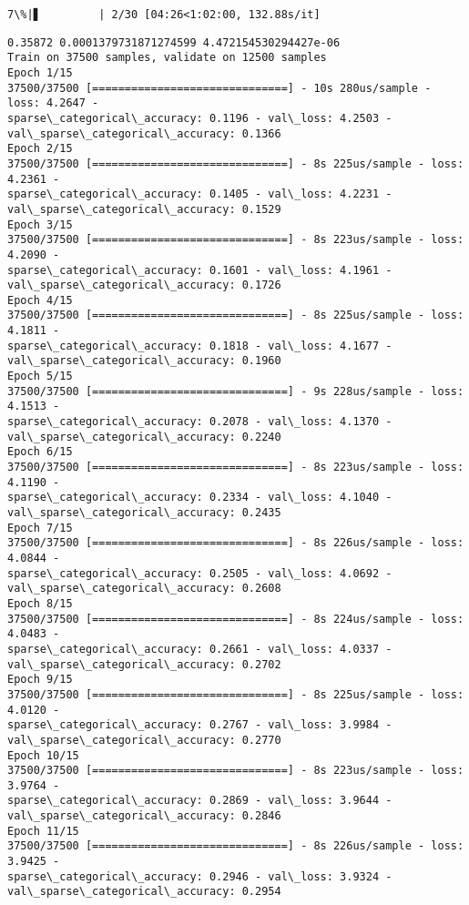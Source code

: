 \documentclass[11pt]{article}
\begin{document}
    \begin{Verbatim}[commandchars=\\\{\}]
  7\%|▋         | 2/30 [04:26<1:02:00, 132.88s/it]
    \end{Verbatim}

    \begin{Verbatim}[commandchars=\\\{\}]
0.35872 0.0001379731871274599 4.472154530294427e-06
Train on 37500 samples, validate on 12500 samples
Epoch 1/15
37500/37500 [==============================] - 10s 280us/sample - loss: 4.2647 -
sparse\_categorical\_accuracy: 0.1196 - val\_loss: 4.2503 -
val\_sparse\_categorical\_accuracy: 0.1366
Epoch 2/15
37500/37500 [==============================] - 8s 225us/sample - loss: 4.2361 -
sparse\_categorical\_accuracy: 0.1405 - val\_loss: 4.2231 -
val\_sparse\_categorical\_accuracy: 0.1529
Epoch 3/15
37500/37500 [==============================] - 8s 223us/sample - loss: 4.2090 -
sparse\_categorical\_accuracy: 0.1601 - val\_loss: 4.1961 -
val\_sparse\_categorical\_accuracy: 0.1726
Epoch 4/15
37500/37500 [==============================] - 8s 225us/sample - loss: 4.1811 -
sparse\_categorical\_accuracy: 0.1818 - val\_loss: 4.1677 -
val\_sparse\_categorical\_accuracy: 0.1960
Epoch 5/15
37500/37500 [==============================] - 9s 228us/sample - loss: 4.1513 -
sparse\_categorical\_accuracy: 0.2078 - val\_loss: 4.1370 -
val\_sparse\_categorical\_accuracy: 0.2240
Epoch 6/15
37500/37500 [==============================] - 8s 223us/sample - loss: 4.1190 -
sparse\_categorical\_accuracy: 0.2334 - val\_loss: 4.1040 -
val\_sparse\_categorical\_accuracy: 0.2435
Epoch 7/15
37500/37500 [==============================] - 8s 226us/sample - loss: 4.0844 -
sparse\_categorical\_accuracy: 0.2505 - val\_loss: 4.0692 -
val\_sparse\_categorical\_accuracy: 0.2608
Epoch 8/15
37500/37500 [==============================] - 8s 224us/sample - loss: 4.0483 -
sparse\_categorical\_accuracy: 0.2661 - val\_loss: 4.0337 -
val\_sparse\_categorical\_accuracy: 0.2702
Epoch 9/15
37500/37500 [==============================] - 8s 225us/sample - loss: 4.0120 -
sparse\_categorical\_accuracy: 0.2767 - val\_loss: 3.9984 -
val\_sparse\_categorical\_accuracy: 0.2770
Epoch 10/15
37500/37500 [==============================] - 8s 223us/sample - loss: 3.9764 -
sparse\_categorical\_accuracy: 0.2869 - val\_loss: 3.9644 -
val\_sparse\_categorical\_accuracy: 0.2846
Epoch 11/15
37500/37500 [==============================] - 8s 226us/sample - loss: 3.9425 -
sparse\_categorical\_accuracy: 0.2946 - val\_loss: 3.9324 -
val\_sparse\_categorical\_accuracy: 0.2954

\end{Verbatim}
\end{document}
